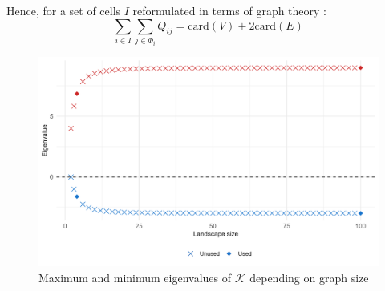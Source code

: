 Hence, for a set of cells $I$ reformulated in terms of graph theory : 
\begin{equation}
        \sum_{i \in I}\sum_{j \in \Phi_i}Q_{ij} = \mathrm{card}(V) + 2 \mathrm{card}(E)
\end{equation}

\begin{figure}[H]
    \centering
    \includegraphics[width=0.8\linewidth]{figures/wildland/eigenvalues.png}
    \caption{Maximum and minimum eigenvalues of $\mathcal{K}$ depending on graph size}
    \label{fig:eigenvalues}
\end{figure}








